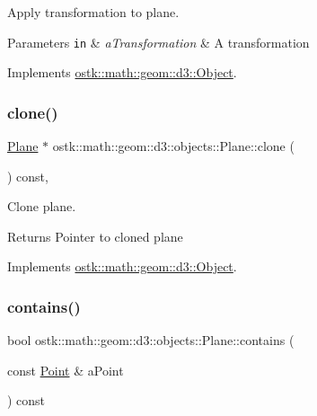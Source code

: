 Apply transformation to plane. 


\begin{DoxyParams}[1]{Parameters}
\mbox{\tt in}  & {\em a\+Transformation} & A transformation \\
\hline
\end{DoxyParams}


Implements \hyperlink{classostk_1_1math_1_1geom_1_1d3_1_1_object_ae9194dd6d2bb4df09292ffc84dccdb1d}{ostk\+::math\+::geom\+::d3\+::\+Object}.

\mbox{\label{classostk_1_1math_1_1geom_1_1d3_1_1objects_1_1_plane_a9db422bcf962c77b11c1d93325aebfd9}} 
\subsubsection{\texorpdfstring{clone()}{clone()}}
{\footnotesize\ttfamily \hyperlink{classostk_1_1math_1_1geom_1_1d3_1_1objects_1_1_plane}{Plane} $\ast$ ostk\+::math\+::geom\+::d3\+::objects\+::\+Plane\+::clone (\begin{DoxyParamCaption}{ }\end{DoxyParamCaption}) const\hspace{0.3cm}{\ttfamily [override]}, {\ttfamily [virtual]}}



Clone plane. 

\begin{DoxyReturn}{Returns}
Pointer to cloned plane 
\end{DoxyReturn}


Implements \hyperlink{classostk_1_1math_1_1geom_1_1d3_1_1_object_a676013f9555f6492687f9809b2db887b}{ostk\+::math\+::geom\+::d3\+::\+Object}.

\mbox{\label{classostk_1_1math_1_1geom_1_1d3_1_1objects_1_1_plane_a62deb80d18f6c9c86a5765a20e91d490}} 
\subsubsection{\texorpdfstring{contains()}{contains()}\hspace{0.1cm}{\footnotesize\ttfamily [1/5]}}
{\footnotesize\ttfamily bool ostk\+::math\+::geom\+::d3\+::objects\+::\+Plane\+::contains (\begin{DoxyParamCaption}\item[{const \hyperlink{classostk_1_1math_1_1geom_1_1d3_1_1objects_1_1_point}{Point} \&}]{a\+Point }\end{DoxyParamCaption}) const}



